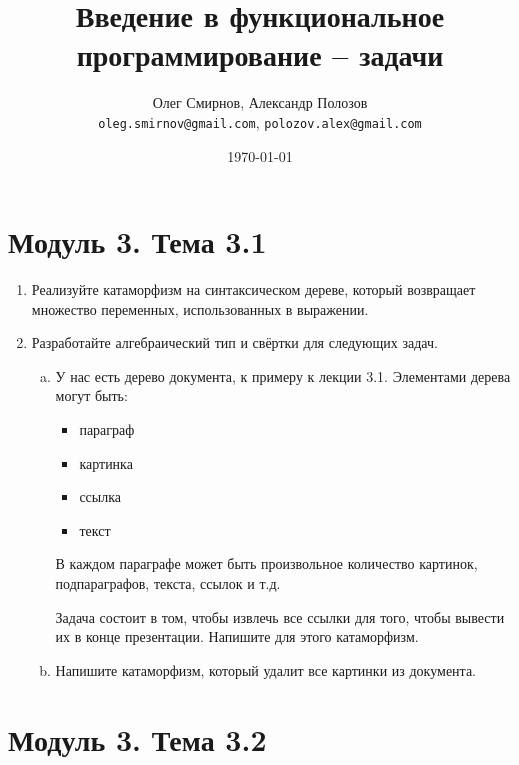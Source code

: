 \documentclass[a4paper,11pt]{article}
\author{Олег Смирнов, Александр Полозов \\
\texttt{oleg.smirnov@gmail.com}, \texttt{polozov.alex@gmail.com}}
\date{\today}
\title{Введение в функциональное программирование -- задачи}
\begin{document}
\section*{Модуль 3. Тема 3.1}
\begin{enumerate}[{3-}1]

\item Реализуйте катаморфизм на синтаксическом дереве, который возвращает
  множество переменных, использованных в выражении.
\item Разработайте алгебраический тип и свёртки для следующих задач.

  \begin{enumerate}[(a)]
  \item У нас есть дерево документа, к примеру к лекции 3.1.
  Элементами дерева могут быть:

  \begin{itemize}
  \item параграф
  \item картинка
  \item ссылка
  \item текст
  \end{itemize}
  В каждом параграфе может быть произвольное количество картинок,
  подпараграфов, текста, ссылок и т.д.

  Задача состоит в том, чтобы извлечь все ссылки для того, чтобы вывести
  их в конце презентации. Напишите для этого катаморфизм.

  \item Напишите катаморфизм, который удалит все картинки из документа.
  \end{enumerate}
\end{enumerate}

\section*{Модуль 3. Тема 3.2}
\end{document}
